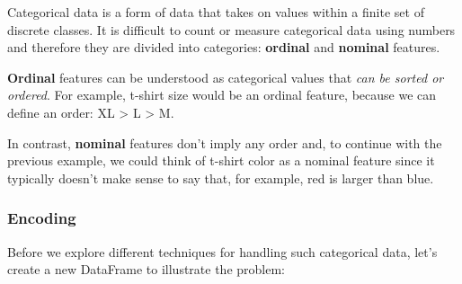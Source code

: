 \documentclass{article}
\begin{document}
    Categorical data is a form of data that takes on values within a finite
set of discrete classes. It is difficult to count or measure categorical
data using numbers and therefore they are divided into categories:
\textbf{ordinal} and \textbf{nominal} features.

\textbf{Ordinal} features can be understood as categorical values that
\emph{can be sorted or ordered}. For example, t-shirt size would be an
ordinal feature, because we can define an order: XL \textgreater{} L
\textgreater{} M.

In contrast, \textbf{nominal} features don't imply any order and, to
continue with the previous example, we could think of t-shirt color as a
nominal feature since it typically doesn't make sense to say that, for
example, red is larger than blue.

    \subsubsection{Encoding}\label{encoding}

    Before we explore different techniques for handling such categorical
data, let's create a new DataFrame to illustrate the problem:
\end{document}
